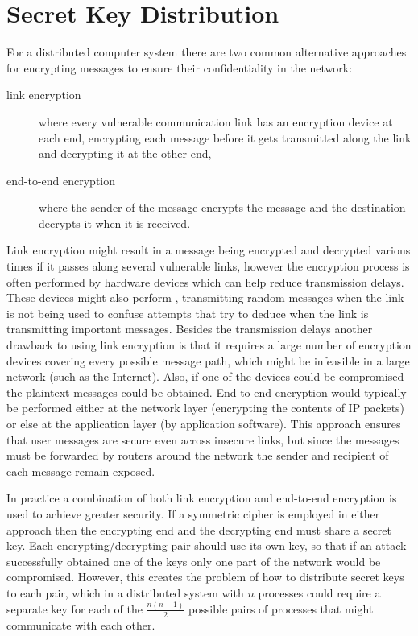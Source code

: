 
\section{Secret Key Distribution}\label{Se:SecretKeyDistribution}


For a distributed computer system there are two common alternative approaches
for encrypting messages to ensure their confidentiality in the network:
\begin{description}
  \item[link encryption] where every vulnerable communication link has an
  encryption device at each end, encrypting each message before it gets
  transmitted along the link and decrypting it at the other end,
  \item[end-to-end encryption] where the sender of the message encrypts the
  message and the destination decrypts it when it is received.
\end{description}
Link encryption might result in a message being encrypted and decrypted
various times if it passes along several vulnerable links, however the
encryption process is often performed by hardware devices which can help
reduce transmission delays.
These devices might also perform , transmitting
random messages when the link is not being used to confuse attempts that try
to deduce when the link is transmitting important messages.
Besides the transmission delays another drawback to using link encryption
is that it requires a large number of encryption devices
covering every possible message path, which might be infeasible in a large network
(such as the Internet). Also, if one of the devices could be compromised
the plaintext messages could be obtained.
End-to-end encryption would typically be performed either at the network layer
(encrypting the contents of IP packets) or else at the application layer
(by application software). This approach ensures that user messages
are secure even across insecure links, but since the messages must be forwarded
by routers around the network the sender and recipient of each message
remain exposed.

In practice a combination of both link encryption and end-to-end encryption is
used to achieve greater security.
If a symmetric cipher is employed in either approach then the encrypting end
and the decrypting end must share a secret key. Each encrypting/decrypting
pair should use its own key, so that if an attack successfully obtained one of the keys
only one part of the network would be compromised.
However, this creates the problem of how to distribute secret keys to each pair,
which in a distributed system with $n$ processes could require a separate key
for each of the $\frac{n(n-1)}{2}$ possible pairs of processes that might communicate
with each other.

